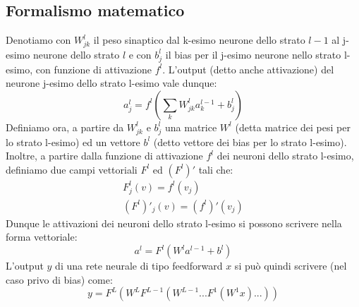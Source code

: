 \documentclass[a4paper]{article}
\begin{document}
\subsection{Formalismo matematico}
Denotiamo con $W_{jk}^l$ il peso sinaptico dal k-esimo neurone dello strato $l-1$ al j-esimo neurone dello strato $l$ e con $b^l_j$ il bias per il j-esimo neurone nello strato l-esimo, con funzione di attivazione $f^l$.
L'output (detto anche attivazione) del neurone j-esimo dello strato l-esimo vale dunque:
\begin{equation}
a_j^l = f^l(\sum_k W_{jk}^l a_k^{l-1} + b_j^l)
\label{attivazioni}
\end{equation}
Definiamo ora, a partire da $W_{jk}^l$ e $b^l_j$ una matrice $W^l$ (detta matrice dei pesi per lo strato l-esimo) ed un vettore $b^l$ (detto vettore dei bias per lo strato l-esimo).
Inoltre, a partire dalla funzione di attivazione $f^l$ dei neuroni dello strato l-esimo, definiamo due campi vettoriali $F^l$ ed $(F^l)'$ tali che:
\begin{align}
F^l_j(v) = f^l(v_j)\\
(F^l)'_j(v) = (f^l)'(v_j)
\end{align}
Dunque le attivazioni dei neuroni dello strato l-esimo si possono scrivere nella forma vettoriale:
\begin{equation}
a^l = F^l(W^l a^{l-1} + b^l)
\end{equation}
L'output $y$ di una rete neurale di tipo feedforward $x$ si può quindi scrivere (nel caso privo di bias) come:
\begin{equation}
y = F^L (W^L F^{L-1}(W^{L-1} ... F^1 ( W^1 x ) ... ))
\end{equation}
\end{document}

